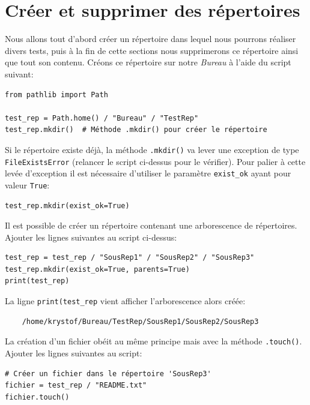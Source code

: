 \documentclass[a4paper,12pt]{book}
\begin{document}
\section{Créer et supprimer des répertoires}
Nous allons tout d'abord créer un répertoire dans lequel nous pourrons réaliser divers tests, puis à la fin de cette sections nous supprimerons ce répertoire ainsi que tout son contenu. Créons ce répertoire sur notre \textit{Bureau} à l'aide du script suivant:
\begin{lstlisting}[caption=Créer un répertoire sur le bureau de l'utilisateur]
from pathlib import Path

test_rep = Path.home() / "Bureau" / "TestRep"
test_rep.mkdir()  # Méthode .mkdir() pour créer le répertoire
\end{lstlisting}
\medskip

Si le répertoire existe déjà, la méthode \texttt{.mkdir()} va lever une exception de type \texttt{FileExistsError} (relancer le script ci-dessus pour le vérifier). Pour palier à cette levée d'exception il est nécessaire d'utiliser le paramètre \texttt{exist\_ok} ayant pour valeur \texttt{True}:
\begin{lstlisting}[caption=Avec \texttt{exist\_ok=True}]
test_rep.mkdir(exist_ok=True)
\end{lstlisting}
\medskip

Il est possible de créer un répertoire contenant une arborescence de répertoires. Ajouter les lignes suivantes au script ci-dessus:
\begin{lstlisting}[caption=Créer une arborescence de répertoires]
test_rep = test_rep / "SousRep1" / "SousRep2" / "SousRep3"
test_rep.mkdir(exist_ok=True, parents=True)
print(test_rep)
\end{lstlisting}
\medskip

La ligne \texttt{print(test\_rep} vient afficher l'arborescence alors créée:
\begin{verbatim}
    /home/krystof/Bureau/TestRep/SousRep1/SousRep2/SousRep3
\end{verbatim}
\medskip

La création d'un fichier obéit au même principe mais avec la méthode \texttt{.touch()}. Ajouter les lignes suivantes au script:
\begin{lstlisting}[caption=Créer un fichier]
# Créer un fichier dans le répertoire 'SousRep3'
fichier = test_rep / "README.txt"
fichier.touch()
\end{lstlisting}
\medskip
\end{document}
